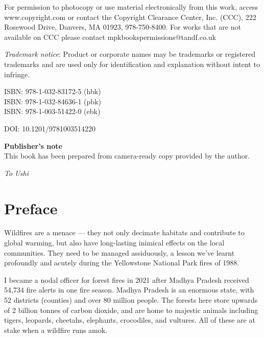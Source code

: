 \documentclass[
  12 pt,
]{Nemilov}
\begin{document}
\noindent For permission to photocopy or use material electronically from this work, access www.copyright.com or contact the Copyright Clearance Center, Inc. (CCC), 222 Rosewood Drive, Danvers, MA 01923, 978-750-8400. For works that are not available on CCC please contact mpkbookspermissions@tandf.co.uk

\noindent \textit{Trademark notice}:\textbf{ }Product or corporate names may be trademarks or registered trademarks and are used only for identification and explanation without intent to infringe.

\noindent ISBN: 978-1-032-83172-5 (hbk)\\
\noindent ISBN: 978-1-032-84636-1 (pbk)\\
\noindent ISBN: 978-1-003-51422-0 (ebk)


\noindent DOI: 10.1201/9781003514220


\noindent \textbf{Publisher's note} \\
\noindent This book has been prepared from camera-ready copy provided by the author.





\newpage

\vspace*{\fill}

\begin{center}
\emph{\Large{To Ushi}}
\end{center}

\vspace*{\fill}

\cleardoublepage


\setlength{\abovedisplayskip}{-5pt}
\setlength{\abovedisplayshortskip}{-5pt}

{
\setcounter{tocdepth}{1}
\tableofcontents
}
\listoffigures
\listoftables
\chapter*{Preface}\label{preface}


Wildfires are a menace --- they not only decimate habitats and contribute to global warming, but also have long-lasting inimical effects on the local communities. They need to be managed assiduously, a lesson we've learnt profoundly and acutely during the Yellowstone National Park fires of 1988.

I became a nodal officer for forest fires in 2021 after Madhya Pradesh received 54,734 fire alerts in one fire season. Madhya Pradesh is an enormous state, with 52 districts (counties) and over 80 million people. The forests here store upwards of 2 billion tonnes of carbon dioxide, and are home to majestic animals including tigers, leopards, cheetahs, elephants, crocodiles, and vultures. All of these are at stake when a wildfire runs amok.
\end{document}
